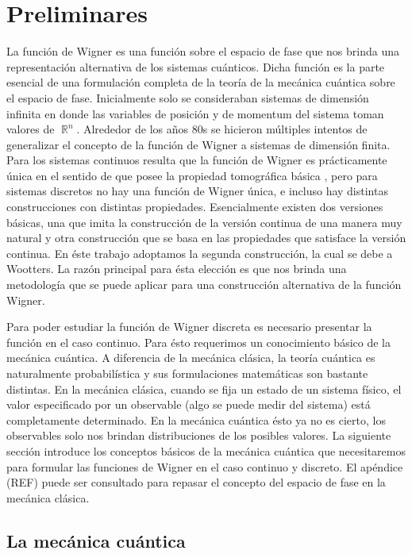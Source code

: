 \documentclass[a4paper]{report}
\DeclareMathOperator{\R}{\mathbb{R}}
\begin{document}
  \chapter{Preliminares}

  La función de Wigner es una función sobre el espacio de
  fase que nos brinda una representación alternativa de los
  sistemas cuánticos. Dicha función es la parte esencial de
  una formulación completa de la teoría de la mecánica
  cuántica sobre el espacio de fase. Inicialmente solo se
  consideraban sistemas de dimensión infinita en donde las
  variables de posición y de momentum del sistema toman
  valores de $\R^{n}$. Alrededor de los años 80s se hicieron
  múltiples intentos de generalizar el concepto de la
  función de Wigner a sistemas de dimensión finita. Para los
  sistemas continuos resulta que la función de Wigner es
  prácticamente única en el sentido de que posee la
  propiedad tomográfica básica \cite{ellinas2008}, pero para
  sistemas discretos no hay una función de Wigner única, e
  incluso hay distintas construcciones con distintas
  propiedades.  Esencialmente existen dos versiones básicas,
  una que imita la construcción de la versión continua de
  una manera muy natural y otra construcción que se basa en
  las propiedades que satisface la versión continua. En éste
  trabajo adoptamos la segunda construcción, la cual se debe
  a Wootters. La razón principal para ésta elección es que
  nos brinda una metodología que se puede aplicar para una
  construcción alternativa de la función Wigner.

  Para poder estudiar la función de Wigner discreta es
  necesario presentar la función en el caso continuo. Para
  ésto requerimos un conocimiento básico de la mecánica
  cuántica. A diferencia de la mecánica clásica, la teoría
  cuántica es naturalmente probabilística y sus
  formulaciones matemáticas son bastante distintas. En la
  mecánica clásica, cuando se fija un estado de un sistema
  físico, el valor especificado por un observable (algo se
  puede medir del sistema) está completamente determinado.
  En la mecánica cuántica ésto ya no es cierto, los
  observables solo nos brindan distribuciones de los
  posibles valores. La siguiente sección introduce los
  conceptos básicos de la mecánica cuántica que
  necesitaremos para formular las funciones de Wigner en el
  caso continuo y discreto. El apéndice (REF) puede ser
  consultado para repasar el concepto del espacio de fase en
  la mecánica clásica. 

  \section{La mecánica cuántica}
\end{document}

